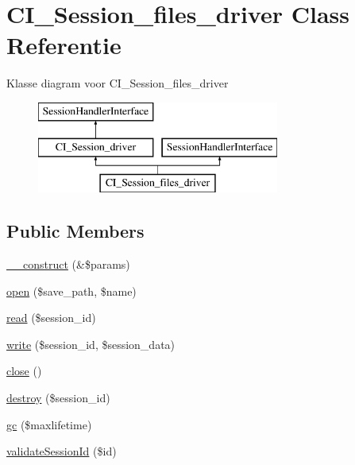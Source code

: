 \hypertarget{class_c_i___session__files__driver}{}\section{C\+I\+\_\+\+Session\+\_\+files\+\_\+driver Class Referentie}
\label{class_c_i___session__files__driver}
Klasse diagram voor C\+I\+\_\+\+Session\+\_\+files\+\_\+driver\begin{figure}[H]
\begin{center}
\leavevmode
\includegraphics[height=3.000000cm]{class_c_i___session__files__driver}
\end{center}
\end{figure}
\subsection*{Public Members}
\begin{DoxyCompactItemize}
\item 
\mbox{\hyperlink{class_c_i___session__files__driver_ac1669c73d53d6f16cf5459a1e84d39c8}{\+\_\+\+\_\+construct}} (\&\$params)
\item 
\mbox{\hyperlink{class_c_i___session__files__driver_a614b5cf3840833913c7a73260ed28e02}{open}} (\$save\+\_\+path, \$name)
\item 
\mbox{\hyperlink{class_c_i___session__files__driver_a5bbf84ebf657be4eaccc0582377c76bf}{read}} (\$session\+\_\+id)
\item 
\mbox{\hyperlink{class_c_i___session__files__driver_ad9d124885be93668f1dbf6aace5964f5}{write}} (\$session\+\_\+id, \$session\+\_\+data)
\item 
\mbox{\hyperlink{class_c_i___session__files__driver_aa69c8bf1f1dcf4e72552efff1fe3e87e}{close}} ()
\item 
\mbox{\hyperlink{class_c_i___session__files__driver_aaec5812f6b4eb6835f88d3baa06a002a}{destroy}} (\$session\+\_\+id)
\item 
\mbox{\hyperlink{class_c_i___session__files__driver_a57aff7ee0656d8aa75d545fb8b3ae35d}{gc}} (\$maxlifetime)
\item 
\mbox{\hyperlink{class_c_i___session__files__driver_a7bee5f3a24cb93e5a7fc371e05046f20}{validate\+Session\+Id}} (\$id)
\end{DoxyCompactItemize}
